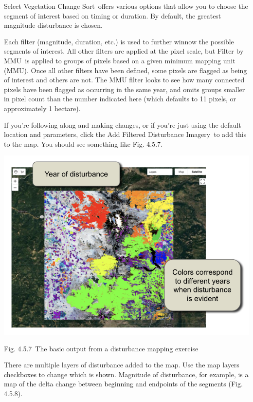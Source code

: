 \documentclass[
  letterpaper,
  DIV=11,
  numbers=noendperiod]{scrreprt}
\begin{document}
Select Vegetation Change Sort~offers various options that allow you to
choose the segment of interest based on timing or duration. By default,
the greatest magnitude disturbance is chosen.

Each filter (magnitude, duration, etc.) is used to further winnow the
possible segments of interest. All other filters are applied at the
pixel scale, but Filter by MMU~is applied to groups of pixels based on a
given minimum mapping unit (MMU). Once all other filters have been
defined, some pixels are flagged as being of interest and others are
not. The MMU filter looks to see how many connected pixels have been
flagged as occurring in the same year, and omits groups smaller in pixel
count than the number indicated here (which defaults to 11 pixels, or
approximately 1 hectare). ~

If you're following along and making changes, or if you're just using
the default location and parameters, click the Add Filtered Disturbance
Imagery~to add this to the map. You should see something like Fig.
4.5.7.

\includegraphics{./F4/image16.png}

Fig. 4.5.7~The basic output from a disturbance mapping exercise ~

There are multiple layers of disturbance added to the map. Use the map
layers checkboxes to change which is shown. Magnitude of disturbance,
for example, is a map of the delta change between beginning and
endpoints of the segments (Fig. 4.5.8).
\end{document}
